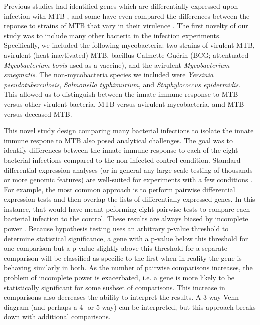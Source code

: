 Previous studies had identified genes which
are differentially expressed upon infection with MTB
\citep{Ehrt2001, Ragno2001, Nau2002, Chaussabel2003, Volpe2006, Tailleux2008}, and some have
even compared the differences between the reponse to strains of MTB
that vary in their virulence \citep{Coscolla2010, Wu2012}. The first novelty of our study was to
include many other bacteria in the infection experiments. Specifically, we
included the following mycobacteria: two strains of virulent MTB,
avirulent (heat-inavtivated) MTB, bacillus Calmette-Gu\'{e}rin (BCG; attentuated \emph{Mycobacterium
  bovis} used as a vaccine), and the avirulent \emph{Mycobacterium
  smegmatis}. The non-mycobacteria species we included were
\emph{Yersinia pseudotuberculosis}, \emph{Salmonella typhimurium}, and
\emph{Staphylococcus epidermidis}. This allowed us to distinguish
between the innate immune response to MTB versus other virulent
bacteria, MTB versus avirulent mycobacteria, amd MTB versus deceased
MTB.

This novel study design comparing many bacterial infections to isolate
the innate immune respone to MTB also posed analytical
challenges. The goal was to identify differences between the innate immune response
to each of the eight bacterial infections compared to the non-infected control condition.
Standard differential expression analyses (or in general
any large scale testing of thousands or more genomic features) are
well-suited for experiments with a few conditions \citep{Oshlack2010, Anders2013, Ritchie2015}. For example, the
most common approach is to perform pairwise differential expression
tests and then overlap the lists of differentially expressed
genes. In this instance, that would have meant peforming eight
pairwise tests to compare each bacterial infection to the control.
These results are always biased by incomplete power \citep{Ding2010, Flutre2013}. Because
hypothesis testing uses an arbitrary p-value threshold to determine
statistical significance, a gene with a p-value below this threshold
for one comparison but a p-value slightly above this threshold for a
separate comparison will be classified as specific to the first when
in reality the gene is behaving similarly in both. As the number of
pairwise comparisons increases, the problem of incomplete power is
exacerbated, i.e. a gene is more likely to be statistically
significant for some susbset of comparisons. This increase in
comparisons also decreases the ability to interpret the results. A
3-way Venn diagram (and perhaps a 4- or 5-way) can be interpreted, but
this approach breaks down with additional comparisons.

